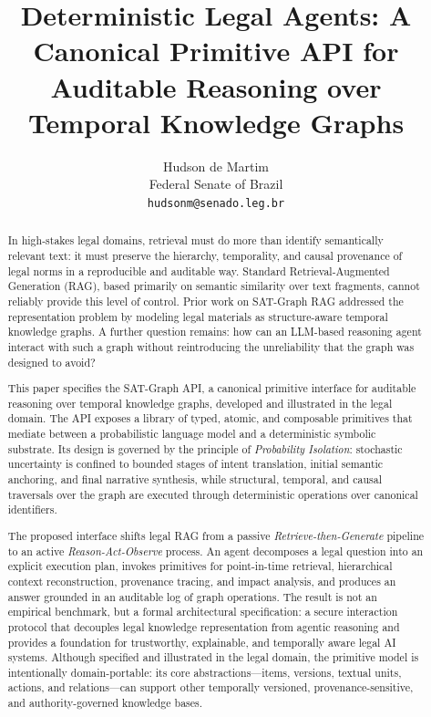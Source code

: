 \documentclass[11pt]{article}
\title{Deterministic Legal Agents: A Canonical Primitive API for Auditable Reasoning over Temporal Knowledge Graphs}
\author{
Hudson de Martim\\
Federal Senate of Brazil\\
\texttt{hudsonm@senado.leg.br}
}
\date{}
\begin{document}
\maketitle

\begin{abstract}
In high-stakes legal domains, retrieval must do more than identify semantically relevant text: it must preserve the hierarchy, temporality, and causal provenance of legal norms in a reproducible and auditable way. Standard Retrieval-Augmented Generation (RAG), based primarily on semantic similarity over text fragments, cannot reliably provide this level of control. Prior work on SAT-Graph RAG addressed the representation problem by modeling legal materials as structure-aware temporal knowledge graphs. A further question remains: how can an LLM-based reasoning agent interact with such a graph without reintroducing the unreliability that the graph was designed to avoid?

This paper specifies the SAT-Graph API, a canonical primitive interface for auditable reasoning over temporal knowledge graphs, developed and illustrated in the legal domain. The API exposes a library of typed, atomic, and composable primitives that mediate between a probabilistic language model and a deterministic symbolic substrate. Its design is governed by the principle of \textit{Probability Isolation}: stochastic uncertainty is confined to bounded stages of intent translation, initial semantic anchoring, and final narrative synthesis, while structural, temporal, and causal traversals over the graph are executed through deterministic operations over canonical identifiers.

The proposed interface shifts legal RAG from a passive \textit{Retrieve-then-Generate} pipeline to an active \textit{Reason-Act-Observe} process. An agent decomposes a legal question into an explicit execution plan, invokes primitives for point-in-time retrieval, hierarchical context reconstruction, provenance tracing, and impact analysis, and produces an answer grounded in an auditable log of graph operations. The result is not an empirical benchmark, but a formal architectural specification: a secure interaction protocol that decouples legal knowledge representation from agentic reasoning and provides a foundation for trustworthy, explainable, and temporally aware legal AI systems. Although specified and illustrated in the legal domain, the primitive model is intentionally domain-portable: its core abstractions---items, versions, textual units, actions, and relations---can support other temporally versioned, provenance-sensitive, and authority-governed knowledge bases.
\end{abstract}
\end{document}
